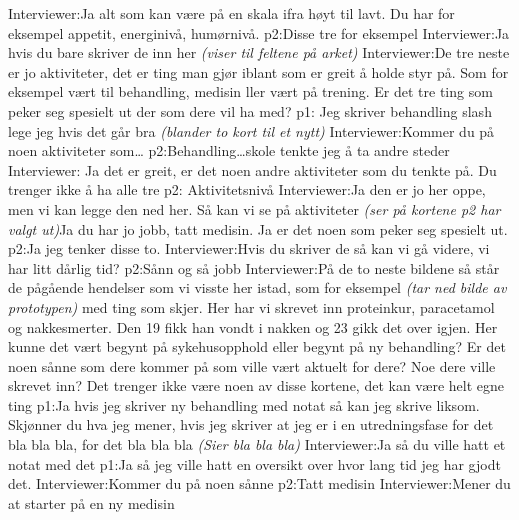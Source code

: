 \documentclass[11pt, norsk, a4paper]{article}
\begin{document}
\textcolor{myBlue} {Interviewer:}Ja alt som kan være på en skala ifra høyt til lavt. Du har for eksempel appetit, energinivå, humørnivå.
\textcolor{myYellow} {p2:}Disse tre for eksempel
\textcolor{myBlue} {Interviewer:}Ja hvis du bare skriver de inn her \textcolor{myGrey}{\textit{(viser til feltene på arket)}}
\textcolor{myBlue} {Interviewer:}De tre neste er jo aktiviteter, det er ting man gjør iblant som er greit å holde styr på. Som for eksempel vært til behandling, medisin ller vært på trening. Er det tre ting som peker seg spesielt ut der som dere vil ha med?
\textcolor{myGreen} {p1:} Jeg skriver behandling slash lege jeg hvis det går bra \textcolor{myGrey}{\textit{(blander to kort til et nytt)}}
\textcolor{myBlue} {Interviewer:}Kommer du på noen aktiviteter som\dots
\textcolor{myYellow} {p2:}Behandling\dots skole tenkte jeg å ta andre steder
\textcolor{myBlue} {Interviewer:} Ja det er greit, er det noen andre aktiviteter som du tenkte på. Du trenger ikke å ha alle tre
\textcolor{myYellow} {p2:} Aktivitetsnivå
\textcolor{myBlue} {Interviewer:}Ja den er jo her oppe, men vi kan legge den ned her. Så kan vi se på aktiviteter \textcolor{myGrey}{\textit{(ser på kortene p2 har valgt ut)}}Ja du har jo jobb, tatt medisin. Ja er det noen som peker seg spesielt ut.
\textcolor{myYellow} {p2:}Ja jeg tenker disse to.
\textcolor{myBlue} {Interviewer:}Hvis du skriver de så kan vi gå videre, vi har litt dårlig tid?
\textcolor{myYellow} {p2:}Sånn og så jobb
\textcolor{myBlue} {Interviewer:}På de to neste bildene så står de pågående hendelser som vi visste her istad, som for eksempel \textcolor{myGrey}{\textit{(tar ned bilde av prototypen)}} med ting som skjer. Her har vi skrevet inn proteinkur, paracetamol og nakkesmerter. Den 19 fikk han vondt i nakken og 23 gikk det over igjen. Her kunne det vært begynt på sykehusopphold eller begynt på ny behandling? Er det noen sånne som dere kommer på som ville vært aktuelt for dere? Noe dere ville skrevet inn? Det trenger ikke være noen av disse kortene, det kan være helt egne ting
\textcolor{myGreen} {p1:}Ja hvis jeg skriver ny behandling med notat så kan jeg skrive liksom. Skjønner du hva jeg mener, hvis jeg skriver at jeg er i en utredningsfase for det bla bla bla, for det bla bla bla \textcolor{myGrey}{\textit{(Sier bla bla bla)}}
\textcolor{myBlue} {Interviewer:}Ja så du ville hatt et notat med det
\textcolor{myGreen} {p1:}Ja så jeg ville hatt en oversikt over hvor lang tid jeg har gjodt det.
\textcolor{myBlue} {Interviewer:}Kommer du på noen sånne
\textcolor{myYellow} {p2:}Tatt medisin
\textcolor{myBlue} {Interviewer:}Mener du at starter på en ny medisin
\end{document}

